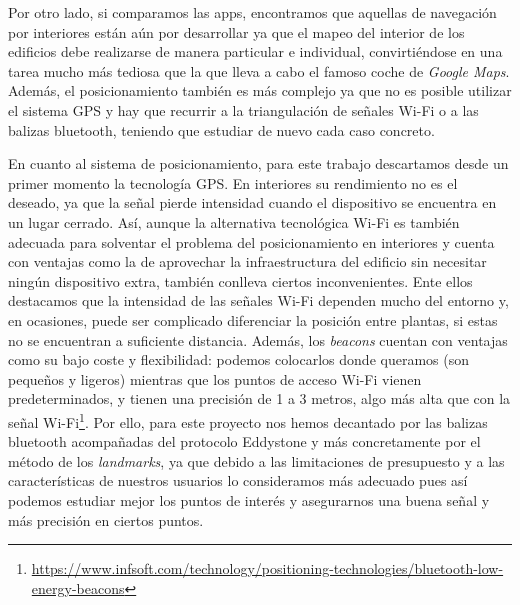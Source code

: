 Por otro lado, si comparamos las apps, encontramos que aquellas de navegación por interiores están aún por desarrollar ya que el mapeo del interior de los edificios debe realizarse de manera particular e individual, convirtiéndose en una tarea mucho más tediosa que la que lleva a cabo el famoso coche de \textit{Google Maps}. Además, el posicionamiento también es más complejo ya que no es posible utilizar el sistema GPS y hay que recurrir a la triangulación de señales Wi-Fi o a las balizas bluetooth, teniendo que estudiar de nuevo cada caso concreto.

En cuanto al sistema de posicionamiento, para este trabajo descartamos desde un primer momento la tecnología GPS. En interiores su rendimiento no es el deseado, ya que la señal pierde intensidad cuando el dispositivo se encuentra en un lugar cerrado. Así, aunque la alternativa tecnológica Wi-Fi es también adecuada para solventar el problema del posicionamiento en interiores y cuenta con ventajas como la de aprovechar la infraestructura del edificio sin necesitar ningún dispositivo extra, también conlleva ciertos inconvenientes. Ente ellos destacamos que la intensidad de las señales Wi-Fi dependen mucho del entorno y, en ocasiones, puede ser complicado diferenciar la posición entre plantas, si estas no se encuentran a suficiente distancia. Además, los \textit{beacons} cuentan con ventajas como su bajo coste y flexibilidad: podemos colocarlos donde queramos (son pequeños y ligeros) mientras que los puntos de acceso Wi-Fi vienen predeterminados, y tienen una precisión de 1 a 3 metros, algo más alta que con la señal Wi-Fi\footnote{\url{https://www.infsoft.com/technology/positioning-technologies/bluetooth-low-energy-beacons}}. Por ello, para este proyecto nos hemos decantado por las balizas bluetooth acompañadas del protocolo Eddystone y más concretamente por el método de los \textit{landmarks}, ya que debido a las limitaciones de presupuesto y a las características de nuestros usuarios lo consideramos más adecuado pues así podemos estudiar mejor los puntos de interés y asegurarnos una buena señal y más precisión en ciertos puntos.






 